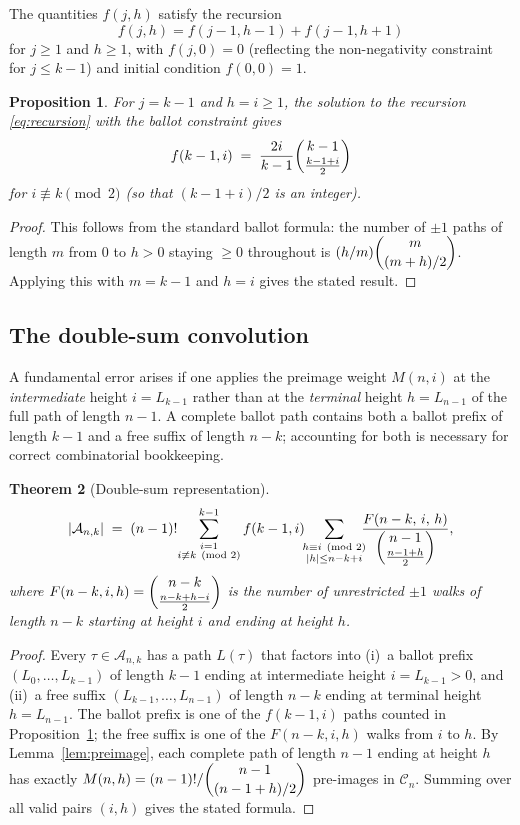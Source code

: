 \documentclass[12pt,a4paper]{article}
\newtheorem{theorem}{Theorem}[section]
\newtheorem{proposition}[theorem]{Proposition}
\theoremstyle{definition}
\newcommand{\Cn}{\mathcal{C}_n}
\renewcommand{\binom}[2]{\dbinom{#1}{#2}}
\newcommand{\abs}[1]{\lvert #1 \rvert}
\begin{document}
The quantities $f(j,h)$ satisfy the recursion
\begin{equation}
\label{eq:recursion}
f(j,h) = f(j-1,h-1) + f(j-1,h+1)
\end{equation}
for $j\ge 1$ and $h\ge 1$, with $f(j,0)=0$ (reflecting the non-negativity
constraint for $j\le k-1$) and initial condition $f(0,0)=1$.

\begin{proposition}
\label{prop:recursion_solution}
For $j=k-1$ and $h=i\ge 1$, the solution to the recursion
\eqref{eq:recursion} with the ballot constraint gives
\[
f(k-1,i) \;=\; \frac{2i}{k-1} \binom{k-1}{\frac{k-1+i}{2}}
\]
for $i\not\equiv k\pmod{2}$ (so that $(k-1+i)/2$ is an integer).
\end{proposition}

\begin{proof}
This follows from the standard ballot formula: the number of $\pm1$
paths of length $m$ from $0$ to $h>0$ staying $\ge0$ throughout is
$(h/m)\binom{m}{(m+h)/2}$.  Applying this with $m=k-1$ and $h=i$
gives the stated result.
\end{proof}

\subsection{The double-sum convolution}

A fundamental error arises if one applies the preimage weight
$M(n,i)$ at the \emph{intermediate} height $i=L_{k-1}$ rather than
at the \emph{terminal} height $h=L_{n-1}$ of the full path of length
$n-1$.  A complete ballot path contains both a ballot prefix of
length $k-1$ and a free suffix of length $n-k$; accounting for both
is necessary for correct combinatorial bookkeeping.

\begin{theorem}[Double-sum representation]
\label{thm:double_sum}
\[
\abs{\mathcal{A}_{n,k}}
\;=\;
(n-1)!\!
\sum_{\substack{i=1\\i\not\equiv k\pmod{2}}}^{k-1}
f(k-1,i)
\!\!
\sum_{\substack{h\equiv i\pmod{2}\\
               \abs{h}\le n-k+i}}
\!\!\!
\frac{F(n-k,\,i,\,h)}{\dbinom{n-1}{\frac{n-1+h}{2}}},
\]
where $F(n-k,i,h)=\dbinom{n-k}{\frac{n-k+h-i}{2}}$ is the number of
unrestricted $\pm 1$ walks of length $n-k$ starting at height $i$
and ending at height $h$.
\end{theorem}

\begin{proof}
Every $\tau\in\mathcal{A}_{n,k}$ has a path $L(\tau)$ that factors
into (i)~a ballot prefix $(L_0,\dots,L_{k-1})$ of length $k-1$
ending at intermediate height $i=L_{k-1}>0$, and (ii)~a free suffix
$(L_{k-1},\dots,L_{n-1})$ of length $n-k$ ending at terminal height
$h=L_{n-1}$.  The ballot prefix is one of the $f(k-1,i)$ paths
counted in Proposition~\ref{prop:recursion_solution}; the free suffix
is one of the $F(n-k,i,h)$ walks from $i$ to $h$.  By
Lemma~\ref{lem:preimage}, each complete path of length $n-1$ ending
at height $h$ has exactly $M(n,h)=(n-1)!/\binom{n-1}{(n-1+h)/2}$
pre-images in $\Cn$.  Summing over all valid pairs $(i,h)$ gives the
stated formula.
\end{proof}
\end{document}
